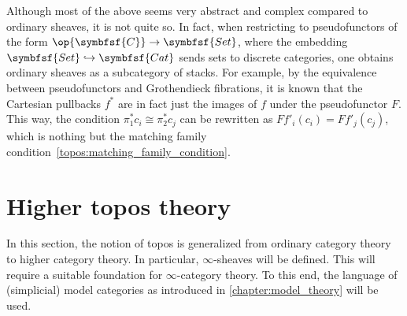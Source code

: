         \begin{remark}[1-sheaves]
            Although most of the above seems very abstract and complex compared to ordinary sheaves, it is not quite so. In fact, when restricting to pseudofunctors of the form $\op{\symbfsf{C}}\rightarrow\symbfsf{Set}$, where the embedding $\symbfsf{Set}\hookrightarrow\symbfsf{Cat}$ sends sets to discrete categories, one obtains ordinary sheaves as a subcategory of stacks. For example, by the equivalence between pseudofunctors and Grothendieck fibrations, it is known that the Cartesian pullbacks $f^*$ are in fact just the images of $f$ under the pseudofunctor $F$. This way, the condition $\pi_1^*c_i\cong\pi^*_2c_j$ can be rewritten as $Ff'_i(c_i)=Ff'_j(c_j)$, which is nothing but the matching family condition~\eqref{topos:matching_family_condition}.
        \end{remark}
    
    \section{Higher topos theory}
    
        In this section, the notion of topos is generalized from ordinary category theory to higher category theory. In particular, $\infty$-sheaves will be defined. This will require a suitable foundation for $\infty$-category theory. To this end, the language of (simplicial) model categories as introduced in \cref{chapter:model_theory} will be used.
    
    
